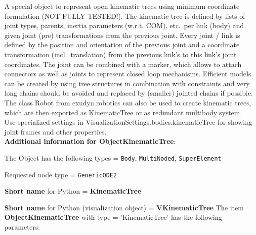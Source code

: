 \label{sec:item:ObjectKinematicTree}
A special object to represent open kinematic trees using minimum coordinate formulation (NOT FULLY TESTED!). The kinematic tree is defined by lists of joint types, parents, inertia parameters (w.r.t. COM), etc.\ per link (body) and given joint (pre) transformations from the previous joint. Every joint / link is defined by the position and orientation of the previous joint and a coordinate transformation (incl.\ translation) from the previous link's to this link's joint coordinates. The joint can be combined with a marker, which allows to attach connectors as well as joints to represent closed loop mechanisms. Efficient models can be created by using tree structures in combination with constraints and very long chains should be avoided and replaced by (smaller) jointed chains if possible. The class Robot from exudyn.robotics can also be used to create kinematic trees, which are then exported as KinematicTree or as redundant multibody system. Use specialized settings in VisualizationSettings.bodies.kinematicTree for showing joint frames and other properties.\vspace{12pt}
 \\{\bf Additional information for ObjectKinematicTree}:
\bi
  \item The Object has the following types = \texttt{Body}, \texttt{MultiNoded}, \texttt{SuperElement}
  \item Requested node type = \texttt{GenericODE2}
  \item {\bf Short name} for Python = {\bf KinematicTree}  \item {\bf Short name} for Python (visualization object) = {\bf VKinematicTree}\ei
\vspace{12pt} \noindent The item {\bf ObjectKinematicTree} with type = 'KinematicTree' has the following parameters:\vspace{-1cm}\\ 
